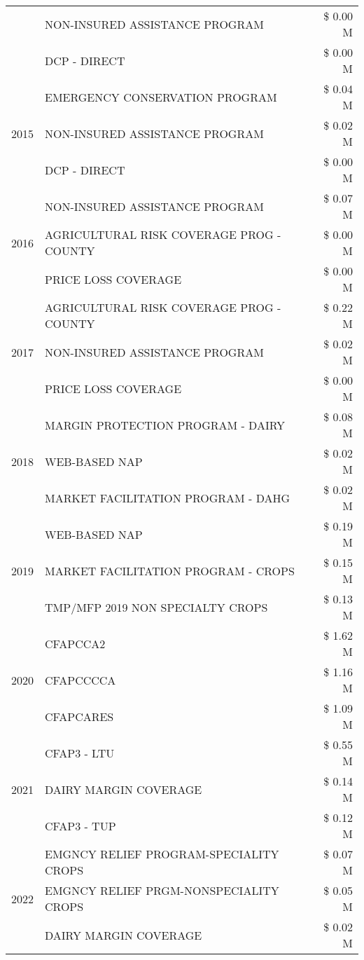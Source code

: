 \begin{tabular}{llr}
 & NON-INSURED ASSISTANCE PROGRAM & \$ 0.00 M \\
 & DCP - DIRECT & \$ 0.00 M \\
\cline{1-3}
\multirow[t]{3}{*}{2015} & EMERGENCY CONSERVATION PROGRAM & \$ 0.04 M \\
 & NON-INSURED ASSISTANCE PROGRAM & \$ 0.02 M \\
 & DCP - DIRECT & \$ 0.00 M \\
\cline{1-3}
\multirow[t]{3}{*}{2016} & NON-INSURED ASSISTANCE PROGRAM & \$ 0.07 M \\
 & AGRICULTURAL RISK COVERAGE PROG - COUNTY & \$ 0.00 M \\
 & PRICE LOSS COVERAGE & \$ 0.00 M \\
\cline{1-3}
\multirow[t]{3}{*}{2017} & AGRICULTURAL RISK COVERAGE PROG - COUNTY & \$ 0.22 M \\
 & NON-INSURED ASSISTANCE PROGRAM & \$ 0.02 M \\
 & PRICE LOSS COVERAGE & \$ 0.00 M \\
\cline{1-3}
\multirow[t]{3}{*}{2018} & MARGIN PROTECTION PROGRAM - DAIRY & \$ 0.08 M \\
 & WEB-BASED NAP & \$ 0.02 M \\
 & MARKET FACILITATION PROGRAM - DAHG & \$ 0.02 M \\
\cline{1-3}
\multirow[t]{3}{*}{2019} & WEB-BASED NAP & \$ 0.19 M \\
 & MARKET FACILITATION PROGRAM - CROPS & \$ 0.15 M \\
 & TMP/MFP 2019 NON SPECIALTY CROPS & \$ 0.13 M \\
\cline{1-3}
\multirow[t]{3}{*}{2020} & CFAPCCA2 & \$ 1.62 M \\
 & CFAPCCCCA & \$ 1.16 M \\
 & CFAPCARES & \$ 1.09 M \\
\cline{1-3}
\multirow[t]{3}{*}{2021} & CFAP3 - LTU & \$ 0.55 M \\
 & DAIRY MARGIN COVERAGE & \$ 0.14 M \\
 & CFAP3 - TUP & \$ 0.12 M \\
\cline{1-3}
\multirow[t]{3}{*}{2022} & EMGNCY RELIEF PROGRAM-SPECIALITY CROPS & \$ 0.07 M \\
 & EMGNCY RELIEF PRGM-NONSPECIALITY CROPS & \$ 0.05 M \\
 & DAIRY MARGIN COVERAGE & \$ 0.02 M \\
\cline{1-3}
\bottomrule
\end{tabular}
